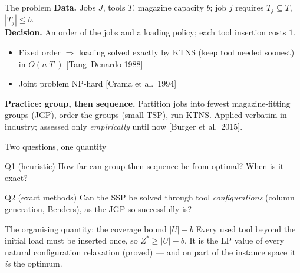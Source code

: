 \documentclass[10pt]{beamer}
\newcommand{\U}{U}\newcommand{\Kst}{K^{\ast}}\newcommand{\Zst}{Z^{\ast}}
\begin{document}
\begin{frame}{The problem}
\textbf{Data.} Jobs $J$, tools $T$, magazine capacity $b$; job $j$ requires
$T_j\subseteq T$, $|T_j|\le b$. \\[1mm]
\textbf{Decision.} An order of the jobs and a loading policy; each tool
insertion costs $1$.\\[3mm]
\begin{itemize}
  \item Fixed order $\Rightarrow$ loading solved exactly by KTNS
        (keep tool needed soonest) in $O(n|T|)$ \hfill {\footnotesize [Tang--Denardo 1988]}
  \item Joint problem NP-hard \hfill {\footnotesize [Crama et al.\ 1994]}
\end{itemize}
\vspace{2mm}
\textbf{Practice: group, then sequence.} Partition jobs into fewest
magazine-fitting groups (JGP), order the groups (small TSP), run KTNS.
Applied verbatim in industry; assessed only \emph{empirically} until now
{\footnotesize [Burger et al.\ 2015]}.
\end{frame}

\begin{frame}{Two questions, one quantity}
\begin{block}{Q1 (heuristic)}
How far can group-then-sequence be from optimal? When is it exact?
\end{block}
\begin{block}{Q2 (exact methods)}
Can the SSP be solved through tool \emph{configurations} (column generation,
Benders), as the JGP so successfully is?
\end{block}
\vspace{2mm}
\begin{alertblock}{The organising quantity: the coverage bound $|\U|-b$}
Every used tool beyond the initial load must be inserted once, so
$\Zst\ge|\U|-b$. It is the LP value of every natural configuration relaxation
(proved) --- and on part of the instance space it \emph{is} the optimum.
\end{alertblock}
\end{frame}
\end{document}
